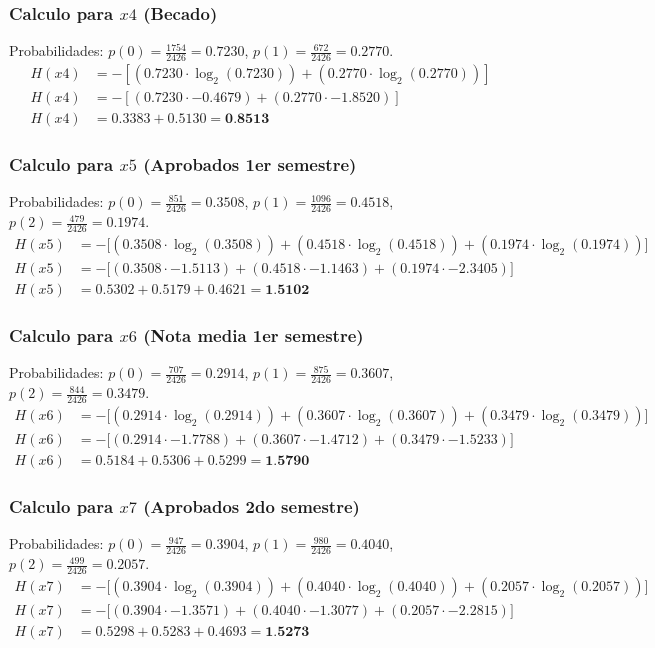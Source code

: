 \documentclass[12pt,a4paper]{article}
\begin{document}
\subsubsection{Calculo para $x4$ (Becado)}
Probabilidades: $p(0) = \frac{1754}{2426} = 0.7230$, $p(1) = \frac{672}{2426} = 0.2770$.
\begin{align*}
    H(x4) &= -\left[ (0.7230 \cdot \log_2(0.7230)) + (0.2770 \cdot \log_2(0.2770)) \right] \\
    H(x4) &= -\left[ (0.7230 \cdot -0.4679) + (0.2770 \cdot -1.8520) \right] \\
    H(x4) &= 0.3383 + 0.5130 = \textbf{0.8513}
\end{align*}

\subsubsection{Calculo para $x5$ (Aprobados 1er semestre)}
Probabilidades: $p(0) = \frac{851}{2426} = 0.3508$, $p(1) = \frac{1096}{2426} = 0.4518$, $p(2) = \frac{479}{2426} = 0.1974$.
\begin{align*}
    H(x5) &= -\big[ (0.3508 \cdot \log_2(0.3508)) + (0.4518 \cdot \log_2(0.4518)) + (0.1974 \cdot \log_2(0.1974)) \big] \\
    H(x5) &= -\big[ (0.3508 \cdot -1.5113) + (0.4518 \cdot -1.1463) + (0.1974 \cdot -2.3405) \big] \\
    H(x5) &= 0.5302 + 0.5179 + 0.4621 = \textbf{1.5102}
\end{align*}

\subsubsection{Calculo para $x6$ (Nota media 1er semestre)}
Probabilidades: $p(0) = \frac{707}{2426} = 0.2914$, $p(1) = \frac{875}{2426} = 0.3607$, $p(2) = \frac{844}{2426} = 0.3479$.
\begin{align*}
    H(x6) &= -\big[ (0.2914 \cdot \log_2(0.2914)) + (0.3607 \cdot \log_2(0.3607)) + (0.3479 \cdot \log_2(0.3479)) \big] \\
    H(x6) &= -\big[ (0.2914 \cdot -1.7788) + (0.3607 \cdot -1.4712) + (0.3479 \cdot -1.5233) \big] \\
    H(x6) &= 0.5184 + 0.5306 + 0.5299 = \textbf{1.5790}
\end{align*}

\subsubsection{Calculo para $x7$ (Aprobados 2do semestre)}
Probabilidades: $p(0) = \frac{947}{2426} = 0.3904$, $p(1) = \frac{980}{2426} = 0.4040$, $p(2) = \frac{499}{2426} = 0.2057$.
\begin{align*}
    H(x7) &= -\big[ (0.3904 \cdot \log_2(0.3904)) + (0.4040 \cdot \log_2(0.4040)) + (0.2057 \cdot \log_2(0.2057)) \big] \\
    H(x7) &= -\big[ (0.3904 \cdot -1.3571) + (0.4040 \cdot -1.3077) + (0.2057 \cdot -2.2815) \big] \\
    H(x7) &= 0.5298 + 0.5283 + 0.4693 = \textbf{1.5273}
\end{align*}
\end{document}

